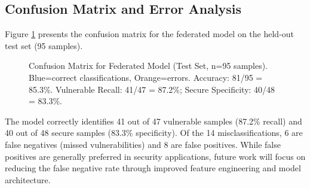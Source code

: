 \documentclass[conference]{IEEEtran}
\begin{document}
\subsection{Confusion Matrix and Error Analysis}

Figure \ref{fig:confusion} presents the confusion matrix for the federated model on the held-out test set (95 samples).

\begin{figure}[h]
\centering
{}
\caption{Confusion Matrix for Federated Model (Test Set, n=95 samples). Blue=correct classifications, Orange=errors. Accuracy: 81/95 = 85.3\%. Vulnerable Recall: 41/47 = 87.2\%; Secure Specificity: 40/48 = 83.3\%.}
\label{fig:confusion}
\end{figure}

The model correctly identifies 41 out of 47 vulnerable samples (87.2\% recall) and 40 out of 48 secure samples (83.3\% specificity). Of the 14 misclassifications, 6 are false negatives (missed vulnerabilities) and 8 are false positives. While false positives are generally preferred in security applications, future work will focus on reducing the false negative rate through improved feature engineering and model architecture.
\end{document}
